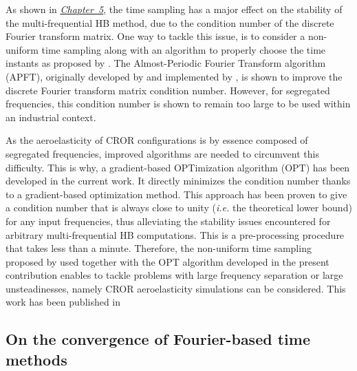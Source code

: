 As shown in \hyperref[cha:limitations_condition_number]{\emph{Chapter~5}},
the time sampling has a major effect on the
stability of the multi-frequential HB 
method, due to the condition number of the discrete Fourier
transform matrix. One way to tackle this issue, 
is to consider a non-uniform time sampling
along with an algorithm to properly choose the time instants
as proposed by \citet{ThesisGuedeney}.
The Almost-Periodic Fourier Transform algorithm (APFT), 
originally developed by \citet{Kundert1988} and implemented by 
\citet{ThesisGuedeney}, is shown to improve the discrete
Fourier transform matrix condition number.
However, for segregated frequencies, this condition number
is shown to remain too large to be used within an industrial context.

As the aeroelasticity of CROR configurations is by essence
composed of segregated frequencies, improved algorithms are needed
to circumvent this difficulty.
This is why, a gradient-based OPTimization algorithm (OPT) 
has been developed in the current work.
It directly minimizes the condition number thanks to a
gradient-based optimization method. This approach has 
been proven to
give a condition number that is always close to unity (\emph{i.e.} the
theoretical lower bound) for any input frequencies,
thus alleviating the stability issues encountered for arbitrary
multi-frequential HB computations.
This is a pre-processing procedure
that takes less than a minute.
Therefore, the non-uniform time sampling proposed by \citet{ThesisGuedeney}
used together with the OPT algorithm 
developed in the present contribution
enables to tackle problems with large frequency 
separation or large unsteadinesses, namely CROR aeroelasticity
simulations can be considered.
This work has been published in
\begin{quote}
\end{quote}


\subsection*{On the convergence of Fourier-based time methods}

